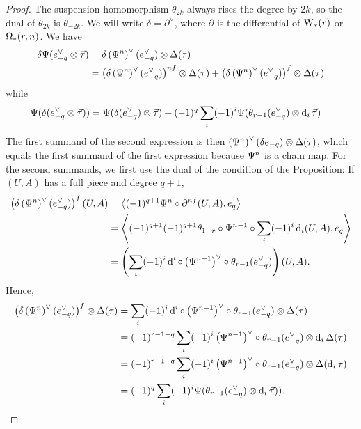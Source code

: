 \begin{proof}
The suspension homomorphism $\theta_{2k}$ always rises the degree by $2k$, so the dual of $\theta_{2k}$ is $\theta_{-2k}$. We will write $\delta = \partial^\vee$, where $\partial$ is the differential of $\operatorname{W}_{*}(r)$ or $\operatorname{\Omega}_{*}(r,n)$. We have
\begin{align*}
	\delta \Psi(e_{-q}^\vee \otimes  \vec{\tau})
		&= \delta \left(\Psi^n\right)^{\vee}(e_{-q}^\vee) \otimes  \Delta(\tau)\\
		&= \left(\delta\left(\Psi^n\right)^{\vee}(e_{-q}^\vee)\right)^{nf} \otimes \Delta(\tau) + \left(\delta\left(\Psi^n\right)^{\vee}(e_{-q}^\vee)\right)^{f} \otimes \Delta(\tau)
\end{align*}
while
\begin{align*}
	\Psi(\delta(e_{-q}^\vee \otimes  \vec{\tau}))
		&=\Psi(\delta(e_{-q}^\vee) \otimes  \vec{\tau}) + (-1)^{q} \sum_i (-1)^{i} \Psi(\theta_{r-1}(e_{-q}^\vee) \otimes  \operatorname{d}_i \vec{\tau})
	\end{align*}
The first summand of the second expression is then $\left(\Psi^n\right)^\vee(\delta e_{-q}) \otimes  \Delta(\tau)$, which equals the first summand of the first expression because $\Psi^{n}$ is a chain map. For the second summands, we first use the dual of the condition of the Proposition: If $(U,A)$ has a full piece and degree $q+1$,
\begin{align*}
	\left(\delta\left(\Psi^n\right)^\vee (e_{-q}^\vee)\right)^{f}(U,A)
	&= \left\langle (-1)^{q+1}\Psi^n\circ \partial^{nf}(U,A),e_{q}\right\rangle
	\\
	&= \left\langle (-1)^{q+1}(-1)^{q+1}\theta_{1-r}\circ \Psi^{n-1}\circ \sum_i (-1)^i \operatorname{d}_i(U,A),e_q\right\rangle
	\\
	&= \left(\sum_i (-1)^i\operatorname{d}^i\circ \left(\Psi^{n-1}\right)^{\vee}\circ \theta_{r-1}(e_{-q}^\vee)\right)(U,A).
\end{align*}
Hence,
\begin{align*}
	\left(\delta\left(\Psi^n\right)^{\vee}(e_{-q}^\vee)\right)^{f} \otimes \Delta(\tau)
		&= \sum_i (-1)^i \operatorname{d}^i\circ \left(\Psi^{n-1}\right)^\vee\circ \theta_{r-1} (e_{-q}^\vee) \otimes \Delta(\tau)
		\\
		&=(-1)^{r-1-q}\sum_i (-1)^i\left(\Psi^{n-1}\right)^\vee \circ \theta_{r-1} (e_{-q}^\vee) \otimes  \operatorname{d}_i\Delta(\tau)
		\\
		&= (-1)^{r-1-q}\sum_i (-1)^i\left(\Psi^{n-1}\right)^\vee \circ \theta_{r-1} (e_{-q}^\vee) \otimes  \Delta(\operatorname{d}_i\tau)
		\\
	&= (-1)^q\sum_i (-1)^{i} \Psi(\theta_{r-1}(e_{-q}^\vee) \otimes  \operatorname{d}_i \vec{\tau})).\qedhere
\end{align*}
\end{proof}

